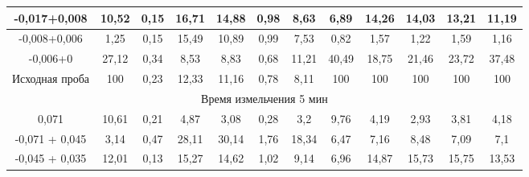 {\begin{longtable}[c]{|p{}ccccccccccc|}
\multicolumn{1}{|c|}{-0,017+0,008} & \multicolumn{1}{c|}{10,52} & \multicolumn{1}{c|}{0,15} & \multicolumn{1}{c|}{16,71} & \multicolumn{1}{c|}{14,88} & \multicolumn{1}{c|}{0,98} & \multicolumn{1}{c|}{8,63} & \multicolumn{1}{c|}{6,89} & \multicolumn{1}{c|}{14,26} & \multicolumn{1}{c|}{14,03} & \multicolumn{1}{c|}{13,21} & 11,19 \\ \hline
\multicolumn{1}{|c|}{-0,008+0,006} & \multicolumn{1}{c|}{1,25} & \multicolumn{1}{c|}{0,15} & \multicolumn{1}{c|}{15,49} & \multicolumn{1}{c|}{10,89} & \multicolumn{1}{c|}{0,99} & \multicolumn{1}{c|}{7,53} & \multicolumn{1}{c|}{0,82} & \multicolumn{1}{c|}{1,57} & \multicolumn{1}{c|}{1,22} & \multicolumn{1}{c|}{1,59} & 1,16 \\ \hline
\multicolumn{1}{|c|}{-0,006+0} & \multicolumn{1}{c|}{27,12} & \multicolumn{1}{c|}{0,34} & \multicolumn{1}{c|}{8,53} & \multicolumn{1}{c|}{8,83} & \multicolumn{1}{c|}{0,68} & \multicolumn{1}{c|}{11,21} & \multicolumn{1}{c|}{40,49} & \multicolumn{1}{c|}{18,75} & \multicolumn{1}{c|}{21,46} & \multicolumn{1}{c|}{23,72} & 37,48 \\ \hline
\multicolumn{1}{|c|}{Исходная проба} & \multicolumn{1}{c|}{100} & \multicolumn{1}{c|}{0,23} & \multicolumn{1}{c|}{12,33} & \multicolumn{1}{c|}{11,16} & \multicolumn{1}{c|}{0,78} & \multicolumn{1}{c|}{8,11} & \multicolumn{1}{c|}{100} & \multicolumn{1}{c|}{100} & \multicolumn{1}{c|}{100} & \multicolumn{1}{c|}{100} & 100 \\ \hline
\multicolumn{12}{|c|}{Время измельчения 5 мин} \\ \hline
\multicolumn{1}{|c|}{0,071} & \multicolumn{1}{c|}{10,61} & \multicolumn{1}{c|}{0,21} & \multicolumn{1}{c|}{4,87} & \multicolumn{1}{c|}{3,08} & \multicolumn{1}{c|}{0,28} & \multicolumn{1}{c|}{3,2} & \multicolumn{1}{c|}{9,76} & \multicolumn{1}{c|}{4,19} & \multicolumn{1}{c|}{2,93} & \multicolumn{1}{c|}{3,81} & 4,18 \\ \hline
\multicolumn{1}{|c|}{-0,071 + 0,045} & \multicolumn{1}{c|}{3,14} & \multicolumn{1}{c|}{0,47} & \multicolumn{1}{c|}{28,11} & \multicolumn{1}{c|}{30,14} & \multicolumn{1}{c|}{1,76} & \multicolumn{1}{c|}{18,34} & \multicolumn{1}{c|}{6,47} & \multicolumn{1}{c|}{7,16} & \multicolumn{1}{c|}{8,48} & \multicolumn{1}{c|}{7,09} & 7,1 \\ \hline
\multicolumn{1}{|c|}{-0,045 + 0,035} & \multicolumn{1}{c|}{12,01} & \multicolumn{1}{c|}{0,13} & \multicolumn{1}{c|}{15,27} & \multicolumn{1}{c|}{14,62} & \multicolumn{1}{c|}{1,02} & \multicolumn{1}{c|}{9,14} & \multicolumn{1}{c|}{6,96} & \multicolumn{1}{c|}{14,87} & \multicolumn{1}{c|}{15,73} & \multicolumn{1}{c|}{15,75} & 13,53 \\ \hline

\end{longtable}}
